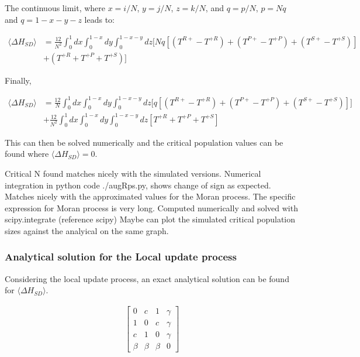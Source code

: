 \documentclass[./main.tex]{subfiles}
\begin{document}
The continuous limit, where $x = i/N$, $y = j/N$, $z = k/N$, and $q = p/N$, $p = Nq$ and $q = 1 - x - y - z$ leads to:

\begin{equation} \nonumber
\begin{aligned}
\langle \Delta H_{SD} \rangle &= \frac{12}{N^2} \int_{0}^{1}dx \int_{0}^{1-x} dy \int_{0}^{1-x-y}dz 
\Big[Nq\left[(T^{R+} - T^{+R}) + (T^{P+} - T^{+P}) +(T^{S+} - T^{+S})\right] \\
&+ (T^{+R} + T^{+P} + T^{+S}) \Big]
\end{aligned}
\end{equation}

Finally,

\begin{equation}
\begin{aligned}
\langle \Delta H_{SD} \rangle &= \frac{12}{N} \int_{0}^{1}dx \int_{0}^{1-x} dy \int_{0}^{1-x-y}dz 
\Big[q\left[(T^{R+} - T^{+R}) + (T^{P+} - T^{+P}) +(T^{S+} - T^{+S})\right]\Big] \\
&+ \frac{12}{N^2} \int_{0}^{1}dx \int_{0}^{1-x} dy \int_{0}^{1-x-y}dz\left[T^{+R} + T^{+P} + T^{+S}\right]
\end{aligned}
\end{equation}

This can then be solved numerically and the critical population values
can be found where $\langle \Delta H_{SD} \rangle = 0$.



\hfill
\par
Critical N found matches nicely with the simulated versions. 
Numerical integration in python code ./augRps.py, shows change of sign as expected. Matches nicely with the approximated values for the Moran process.
The specific expression for Moran process is very long. Computed numerically and solved with scipy.integrate (reference scipy)
Maybe can plot the simulated critical population sizes against the analyical on the same graph.


\subsubsection{Analytical solution for the Local update process}

Considering the local update process, an exact analytical solution can be found for 
$\langle \Delta H_{SD} \rangle$.

\begin{align} \label{SimplifiedRPS}
\begin{bmatrix}
    0 & c & 1 & \gamma\\
    1 & 0 & c & \gamma\\
    c & 1 & 0 & \gamma\\
    \beta & \beta & \beta & 0
\end{bmatrix}
\end{align}
\end{document}
